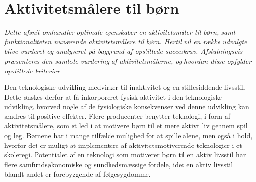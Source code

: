 \section{Aktivitetsmålere til børn} \label{tracker_intro}

\textit{Dette afsnit omhandler optimale egenskaber en aktivitetsmåler til børn, samt funktionaliteten nuværende aktivitetsmålere til børn. Hertil vil en række udvalgte blive vurderet og analyseret på baggrund af opstillede succeskrav. Afslutningsvis præsenteres den samlede vurdering af aktivitetsmålerne, og hvordan disse opfylder opstillede kriterier.}

%



Den teknologiske udvikling medvirker til inaktivitet og en stillesiddende livsstil. Dette ønskes derfor at få inkorporeret fysisk aktivitet i den teknologiske udvikling, hvorved nogle af de fysiologiske konsekvenser ved denne udvikling kan ændres til positive effekter. \citep{ObesityActionCoalition} Flere producenter benytter teknologi, i form af aktivitetsmålere, som et led i at motivere børn til et mere aktivt liv gennem spil og leg. Børnene har i mange tilfælde mulighed for at spille alene, men også i hold, hvorfor det er muligt at implementere af aktivitetsmotiverende teknologier i et skoleregi. \citep{Fuhu2015,PowerAbout2015}
Potentialet af en teknologi som motiverer børn til en aktiv livsstil har flere samfundsøkonomiske og sundhedsmæssige fordele, idet en aktiv livsstil blandt andet er forebyggende af følgesygdomme.


